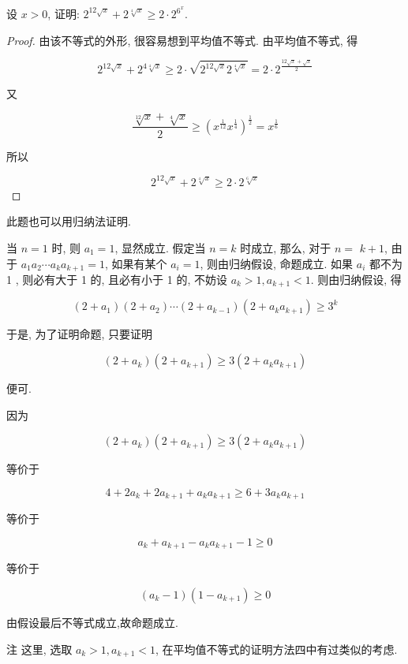 \begin{example}
	设 $x>0$, 证明: $2^{12 \sqrt{x}}+2^{\sqrt[4]{x}} \geqslant 2 \cdot 2^{6^{x}}$.
\end{example}
\begin{proof}
	由该不等式的外形, 很容易想到平均值不等式. 由平均值不等式, 得
	
	$$
	2^{12 \sqrt{x}}+2^{4 \sqrt[4]{x}} \geqslant 2 \cdot \sqrt{2^{12 \sqrt{x}} 2^{\sqrt[4]{x}}}=2 \cdot 2^{\frac{12 \sqrt{x}+\sqrt{x}}{2}}
	$$
	
	又
	
	$$
	\frac{\sqrt[12]{x}+\sqrt[4]{x}}{2} \geqslant\left(x^{\frac{1}{12}} x^{\frac{1}{4}}\right)^{\frac{1}{2}}=x^{\frac{1}{6}}
	$$
	
	所以
	
	$$
	2^{12 \sqrt{x}}+2^{\sqrt[4]{x}} \geqslant 2 \cdot 2^{\sqrt[6]{x}}
	$$
\end{proof}
\begin{note}
	此题也可以用归纳法证明.
	
	当 $n=1$ 时, 则 $a_{1}=1$, 显然成立. 假定当 $n=k$ 时成立, 那么, 对于 $n=$ $k+1$, 由于 $a_{1} a_{2} \cdots a_{k} a_{k+1}=1$, 如果有某个 $a_{i}=1$, 则由归纳假设, 命题成立. 如果 $a_{i}$ 都不为 1 , 则必有大于 1 的, 且必有小于 1 的, 不妨设 $a_{k}>1, a_{k+1}<1$. 则由归纳假设, 得
	
	$$
	\left(2+a_{1}\right)\left(2+a_{2}\right) \cdots\left(2+a_{k-1}\right)\left(2+a_{k} a_{k+1}\right) \geqslant 3^{k}
	$$
	
	于是, 为了证明命题, 只要证明
	
	$$
	\left(2+a_{k}\right)\left(2+a_{k+1}\right) \geqslant 3\left(2+a_{k} a_{k+1}\right)
	$$
	
	便可.
	
	因为
	
	$$
	\left(2+a_{k}\right)\left(2+a_{k+1}\right) \geqslant 3\left(2+a_{k} a_{k+1}\right)
	$$
	
	等价于
	
	$$
	4+2 a_{k}+2 a_{k+1}+a_{k} a_{k+1} \geqslant 6+3 a_{k} a_{k+1}
	$$
	
	等价于
	
	$$
	a_{k}+a_{k+1}-a_{k} a_{k+1}-1 \geqslant 0
	$$
	
	等价于
	
	$$
	\left(a_{k}-1\right)\left(1-a_{k+1}\right) \geqslant 0
	$$
	
	由假设最后不等式成立,故命题成立.
	
	注 这里, 选取 $a_{k}>1, a_{k+1}<1$, 在平均值不等式的证明方法四中有过类似的考虑.
\end{note}

